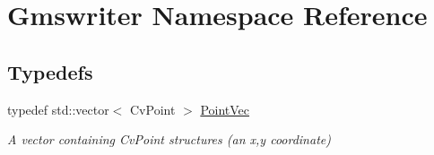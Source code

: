 \hypertarget{namespaceGmswriter}{
\section{Gmswriter Namespace Reference}
\label{namespaceGmswriter}
}
\subsection*{Typedefs}
\begin{DoxyCompactItemize}
\item 
\hypertarget{namespaceGmswriter_ae29ac381dbacafec38fd0a06eff6e1ba}{
typedef std::vector$<$ CvPoint $>$ \hyperlink{namespaceGmswriter_ae29ac381dbacafec38fd0a06eff6e1ba}{PointVec}}
\label{namespaceGmswriter_ae29ac381dbacafec38fd0a06eff6e1ba}

\begin{DoxyCompactList}\small\item\em A vector containing CvPoint structures (an x,y coordinate) \end{DoxyCompactList}\end{DoxyCompactItemize}
